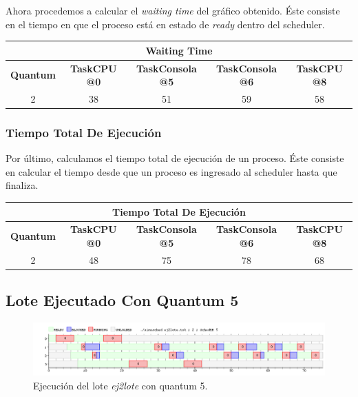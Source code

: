 Ahora procedemos a calcular el \emph{waiting time} del gráfico obtenido. Éste consiste en el tiempo en que el proceso está en estado de \textit{ready} dentro del scheduler.

\begin{center}
	\begin{tabular}{|c|c|c|c|c|}
		\hline
		\multicolumn{5}{|c|}{\large{\textbf{Waiting Time}}} \\
		\hline
		\textbf{Quantum} & \textbf{TaskCPU @0} & \textbf{TaskConsola @5} & \textbf{TaskConsola @6} & \textbf{TaskCPU @8} \\
		\hline
		2 & 38 & 51 & 59 & 58 \\
		\hline
	\end{tabular}
\end{center}

\subsubsection{Tiempo Total De Ejecución} \label{explicacion_tiempoTDE}

Por último, calculamos el tiempo total de ejecución de un proceso. Éste consiste en calcular el tiempo desde que un proceso es ingresado al scheduler hasta que finaliza.

\begin{center}
	\begin{tabular}{|c|c|c|c|c|}
		\hline
		\multicolumn{5}{|c|}{\large{\textbf{Tiempo Total De Ejecución}}} \\
		\hline
		\textbf{Quantum} & \textbf{TaskCPU @0} & \textbf{TaskConsola @5} & \textbf{TaskConsola @6} & \textbf{TaskCPU @8} \\
		\hline
		2 & 48 & 75 & 78 & 68 \\
		\hline
	\end{tabular}
\end{center}

\newpage

\subsection{Lote Ejecutado Con Quantum 5}

\begin{figure}[!h]
	\begin{center}
		\includegraphics[width=500px]{imagenes/ej5_5.png}
		\caption{Ejecución del lote \emph{ej2lote} con quantum 5.}
		\label{fig:grafico_ej5_5}
	\end{center}
\end{figure}

